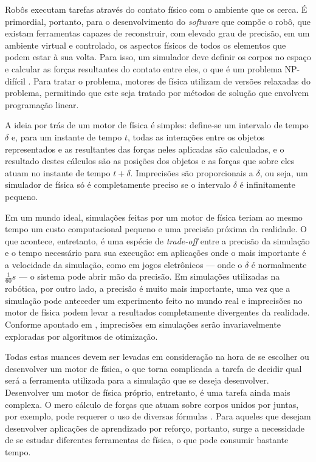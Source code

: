 \documentclass[cic,tc]{iiufrgs}
\begin{document}
Robôs executam tarefas através do contato físico com o ambiente que os cerca. É
primordial, portanto, para o desenvolvimento do \textit{software} que compõe o
robô, que existam ferramentas capazes de reconstruir, com elevado grau de
precisão, em um ambiente virtual e controlado, os aspectos físicos de todos os
elementos que podem estar à sua volta. Para isso, um simulador deve definir os
corpos no espaço e calcular as forças resultantes do contato entre eles, o que é
um problema NP-difícil \cite{Kaufman2008}. Para tratar o problema, motores de
física utilizam de versões relaxadas do problema, permitindo que este seja
tratado por métodos de solução que envolvem programação linear.


A ideia por trás de um motor de física é simples:  define-se um intervalo de
tempo $\delta$ e, para um instante de tempo $t$, todas as interações entre os
objetos representados e as resultantes das forças neles aplicadas são
calculadas, e o resultado destes cálculos são as posições dos objetos e as
forças que sobre eles atuam no instante de tempo $t+\delta$. Imprecisões são
proporcionais a $\delta$, ou seja, um simulador de física só é completamente
preciso se o intervalo $\delta$ é infinitamente pequeno.


Em um mundo ideal, simulações feitas por um motor de física teriam ao mesmo
tempo um custo computacional pequeno e uma precisão próxima da realidade. O que
acontece, entretanto, é uma espécie de \textit{trade-off} entre a precisão da
simulação e o tempo necessário para sua execução: em aplicações onde o mais
importante é a velocidade da simulação, como em jogos eletrônicos --- onde o
$\delta$ é normalmente $\frac{1}{60}s$ --- o sistema pode abrir mão da precisão.
Em simulações utilizadas na robótica, por outro lado, a precisão é muito mais
importante, uma vez que a simulação pode anteceder um experimento feito no
mundo real e imprecisões no motor de física podem levar a resultados
completamente divergentes da realidade. Conforme apontado em \cite{Sims1994},
imprecisões em simulações serão invariavelmente exploradas por algoritmos de
otimização.


Todas estas nuances devem ser levadas em consideração na hora de se escolher ou
desenvolver um motor de física, o que torna complicada a tarefa de decidir qual
será a ferramenta utilizada para a simulação que se deseja desenvolver.
Desenvolver um motor de física próprio, entretanto, é uma tarefa ainda mais
complexa. O mero cálculo de forças que atuam sobre corpos unidos por juntas, por
exemplo, pode requerer o uso de diversas fórmulas \cite{ODEJoints2002}. Para
aqueles que desejam desenvolver aplicações de aprendizado por reforço, portanto,
surge a necessidade de se estudar diferentes ferramentas de física, o que pode
consumir bastante tempo.
\end{document}
